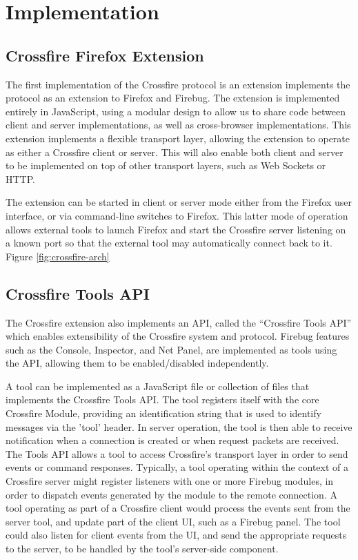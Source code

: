 \section{Implementation}

\subsection{Crossfire Firefox Extension}
The first implementation of the Crossfire protocol is an extension implements
the protocol as an extension to Firefox and Firebug. The extension is
implemented entirely in JavaScript, using a modular design to allow us to share
code between client and server implementations, as well as cross-browser
implementations. This extension implements a flexible transport layer, allowing
the extension to operate as either a Crossfire client or server. This will also
enable both client and server to be implemented on top of other transport
layers, such as Web Sockets or HTTP.

The extension can be started in client or server mode either from the Firefox
user interface, or via command-line switches to Firefox. This latter mode of
operation allows external tools to launch Firefox and start the Crossfire server
listening on a known port so that the external tool may automatically connect
back to it. Figure \ref{fig:crossfire-arch}

\subsection{Crossfire Tools API}
The Crossfire extension also implements an API, called the ``Crossfire Tools
API'' which enables extensibility of the Crossfire system and protocol. Firebug
features such as the Console, Inspector, and Net Panel, are implemented as tools
using the API, allowing them to be enabled/disabled independently.

A tool can be implemented as a JavaScript file or collection of files that
implements the Crossfire Tools API. The tool registers itself with the core
Crossfire Module, providing an identification string that is used to identify
messages via the 'tool' header. In server operation, the tool is then able to
receive notification when a connection is created or when request packets are
received. The Tools API allows a tool to access Crossfire's transport layer in
order to send events or command responses.  Typically, a tool operating within
the context of a Crossfire server might register listeners with one or more
Firebug modules, in order to dispatch events generated by the module to the
remote connection. A tool operating as part of a Crossfire client would process
the events sent from the server tool, and update part of the client UI, such as
a Firebug panel. The tool could also listen for client events from the UI, and
send the appropriate requests to the server, to be handled by the tool's
server-side component.

